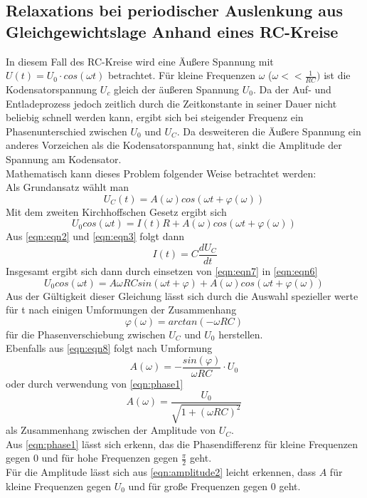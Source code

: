 \subsection{Relaxations bei periodischer Auslenkung aus Gleichgewichtslage Anhand eines RC-Kreise}
In diesem Fall des RC-Kreise wird eine Äußere Spannung mit $U(t)=U_{0}\cdot cos(\omega t)$ betrachtet.
Für kleine Frequenzen $\omega$ ($\omega << \frac{1}{RC})$ ist die Kodensatorspannung $U_{c}$ gleich der äußeren Spannung $U_0$. Da der Auf- und Entladeprozess jedoch zeitlich 
durch die Zeitkonstante in seiner Dauer nicht beliebig schnell werden kann, ergibt sich bei steigender Frequenz ein Phasenunterschied zwischen $U_0$ und $U_C$. 
Da desweiteren die Äußere Spannung ein anderes Vorzeichen als die Kodensatorspannung hat, sinkt die Amplitude der Spannung am Kodensator.\\
Mathematisch kann dieses Problem folgender Weise betrachtet werden:\\
Als Grundansatz wählt man
\begin{equation}
    U_{C}(t)= A(\omega)cos(\omega t+ \varphi (\omega))  \,
    \label{eqn:ansatz}
\end{equation}
Mit dem zweiten Kirchhoffschen Gesetz ergibt sich
\begin{equation}
U_{0}cos(\omega t)= I(t)R + A(\omega)cos(\omega t+ \varphi (\omega)) \,
\label{eqn:eqn6}
\end{equation}
Aus \ref{eqn:eqn2} und \ref{eqn:eqn3} folgt dann 
\begin{equation}
I(t)= C\frac{dU_{C}}{dt}
\label{eqn:eqn7}
\end{equation}
Insgesamt ergibt sich dann durch einsetzen von \ref{eqn:eqn7} in \ref{eqn:eqn6}
\begin{equation}
    U_{0}cos(\omega t)= A \omega RC sin(\omega t + \varphi) + A(\omega)cos(\omega t+ \varphi (\omega)) \,
\label{eqn:eqn8}
\end{equation}
Aus der Gültigkeit dieser Gleichung lässt sich durch die Auswahl spezieller werte für t nach einigen Umformungen der Zusammenhang 
\begin{equation}
    \varphi (\omega) = arctan(-\omega RC)\,
    \label{eqn:phase1}
\end{equation}
für die Phasenverschiebung zwischen $U_{C}$ und $U_{0}$ herstellen.\\
Ebenfalls aus \ref{eqn:eqn8} folgt nach Umformung 
\begin{equation}
    A(\omega)= -\frac{sin(\varphi)}{\omega RC}\cdot U_{0}\,
    \label{eqn:amplitude1}
\end{equation}
oder durch verwendung von \ref{eqn:phase1}
\begin{equation}
    A(\omega)= \frac{U_{0}}{\sqrt{1+ (\omega RC)^2}}\,
    \label{eqn:amplitude2}
\end{equation}
als Zusammenhang zwischen der Amplitude von $U_{C}$.\\
Aus \ref{eqn:phase1} lässt sich erkenn, das die Phasendifferenz für kleine Frequenzen gegen 0 und für hohe Frequenzen gegen $\frac{\pi}{2}$ geht.\\
Für die Amplitude lässt sich aus \ref{eqn:amplitude2} leicht erkennen, dass $A$ für kleine Frequenzen gegen $U_{0}$ und für große Frequenzen gegen 0 geht.


